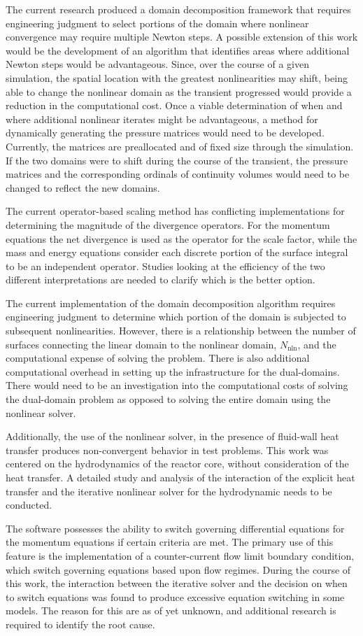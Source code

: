 The current research produced a domain decomposition framework that requires engineering judgment to select portions of the domain where nonlinear convergence may require multiple Newton steps.
A possible extension of this work would be the development of an algorithm that identifies areas where additional Newton steps would be advantageous.
Since, over the course of a given simulation, the spatial location with the greatest nonlinearities may shift, being able to change the nonlinear domain as the transient progressed would provide a reduction in the computational cost.
Once a viable determination of when and where additional nonlinear iterates might be advantageous, a method for dynamically generating the pressure matrices would need to be developed.
Currently, the matrices are preallocated and of fixed size through the simulation.
If the two domains were to shift during the course of the transient, the pressure matrices and the corresponding ordinals of continuity volumes would need to be changed to reflect the new domains.

The current operator-based scaling method has conflicting implementations for determining the magnitude of the divergence operators.
For the momentum equations the net divergence is used as the operator for the scale factor, while the mass and energy equations consider each discrete portion of the surface integral to be an independent operator.
Studies looking at the efficiency of the two different interpretations are needed to clarify which is the better option.

The current implementation of the domain decomposition algorithm requires engineering judgment to determine which portion of the domain is subjected to subsequent nonlinearities.
However, there is a relationship between the number of surfaces connecting the linear domain to the nonlinear domain, $N_{\text{nln}}$, and the computational expense of solving the problem.
There is also additional computational overhead in setting up the infrastructure for the dual-domains.
There would need to be an investigation into the computational costs of solving the dual-domain problem as opposed to solving the entire domain using the nonlinear solver.

Additionally, the use of the nonlinear solver, in the presence of fluid-wall heat transfer produces non-convergent behavior in test problems.
This work was centered on the hydrodynamics of the reactor core, without consideration of the heat transfer.
A detailed study and analysis of the interaction of the explicit heat transfer and the iterative nonlinear solver for the hydrodynamic needs to be conducted.

The \cobra{} software possesses the ability to switch governing differential equations for the momentum equations if certain criteria are met.
The primary use of this feature is the implementation of a counter-current flow limit boundary condition, which switch governing equations based upon flow regimes.
During the course of this work, the interaction between the iterative solver and the decision on when to switch equations was found to produce excessive equation switching in some models.
The reason for this are as of yet unknown, and additional research is required to identify the root cause.